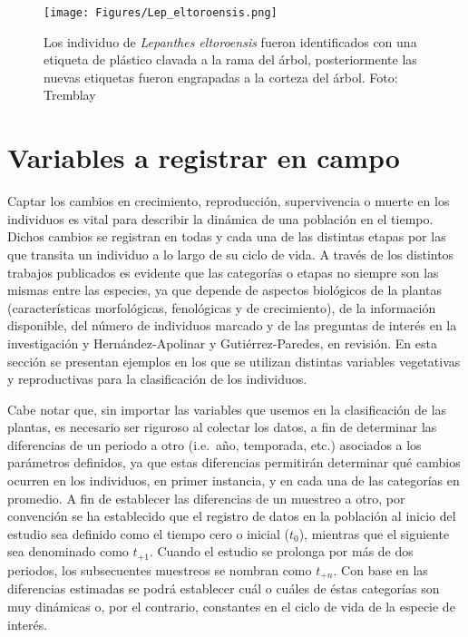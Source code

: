 \documentclass[
]{book}
\theoremstyle{definition}
\theoremstyle{definition}
\theoremstyle{definition}
\theoremstyle{definition}
\theoremstyle{remark}
\begin{document}
\begin{figure}
\centering
\texttt{[image: Figures/Lep\_eltoroensis.png]}
\caption{Los individuo de \emph{Lepanthes eltoroensis} fueron identificados con una etiqueta de plástico clavada a la rama del árbol, posteriormente las nuevas etiquetas fueron engrapadas a la corteza del árbol. Foto: Tremblay}
\end{figure}

\section{Variables a registrar en campo}\label{variables-a-registrar-en-campo}

Captar los cambios en crecimiento, reproducción, supervivencia o muerte en los individuos es vital para describir la dinámica de una población en el tiempo.
Dichos cambios se registran en todas y cada una de las distintas etapas por las que transita un individuo a lo largo de su ciclo de vida.
A través de los distintos trabajos publicados es evidente que las categorías o etapas no siempre son las mismas entre las especies, ya que depende de aspectos biológicos de la plantas (características morfológicas, fenológicas y de crecimiento), de la información disponible, del número de individuos marcado y de las preguntas de interés en la investigación \citep{hernandez1992dinamica, mondragon2013population} y Hernández-Apolinar y Gutiérrez-Paredes, en revisión.
En esta sección se presentan ejemplos en los que se utilizan distintas variables vegetativas y reproductivas para la clasificación de los individuos.

Cabe notar que, sin importar las variables que usemos en la clasificación de las plantas, es necesario ser riguroso al colectar los datos, a fin de determinar las diferencias de un periodo a otro (i.e.~año, temporada, etc.) asociados a los parámetros definidos, ya que estas diferencias permitirán determinar qué cambios ocurren en los individuos, en primer instancia, y en cada una de las categorías en promedio.
A fin de establecer las diferencias de un muestreo a otro, por convención se ha establecido que el registro de datos en la población al inicio del estudio sea definido como el tiempo cero o inicial (\(t_{0}\)), mientras que el siguiente sea denominado como \(t_{+1}\).
Cuando el estudio se prolonga por más de dos periodos, los subsecuentes muestreos se nombran como \(t_{+n}\).
Con base en las diferencias estimadas se podrá establecer cuál o cuáles de éstas categorías son muy dinámicas o, por el contrario, constantes en el ciclo de vida de la especie de interés.
\end{document}
